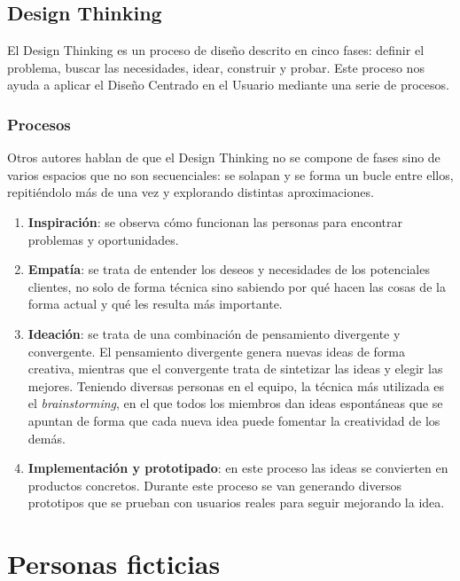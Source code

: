 \subsection{Design Thinking}

El Design Thinking es un proceso de diseño descrito en cinco fases:\cite{designThinkingPlattner} definir el problema, buscar las necesidades, idear, construir y probar. Este proceso nos ayuda a aplicar el Diseño Centrado en el Usuario mediante una serie de procesos.

\subsubsection{Procesos}

Otros autores hablan de que el Design Thinking no se compone de fases sino de varios espacios que no son secuenciales: se solapan y se forma un bucle entre ellos, repitiéndolo más de una vez y explorando distintas aproximaciones\cite{designThinkingBrown}.

\begin{enumerate}
    \item \textbf{Inspiración}: se observa cómo funcionan las personas para encontrar problemas y oportunidades.
    \item \textbf{Empatía}: se trata de entender los deseos y necesidades de los potenciales clientes, no solo de forma técnica sino sabiendo por qué hacen las cosas de la forma actual y qué les resulta más importante.
    \item \textbf{Ideación}: se trata de una combinación de pensamiento divergente y convergente. El pensamiento divergente genera nuevas ideas de forma creativa, mientras que el convergente trata de sintetizar las ideas y elegir las mejores.
    Teniendo diversas personas en el equipo, la técnica más utilizada es el \textit{brainstorming}, en el que todos los miembros dan ideas espontáneas que se apuntan de forma que cada nueva idea puede fomentar la creatividad de los demás.
    \item \textbf{Implementación y prototipado}: en este proceso las ideas se convierten en productos concretos. Durante este proceso se van generando diversos prototipos que se prueban con usuarios reales para seguir mejorando la idea.
\end{enumerate}


\section{Personas ficticias}

